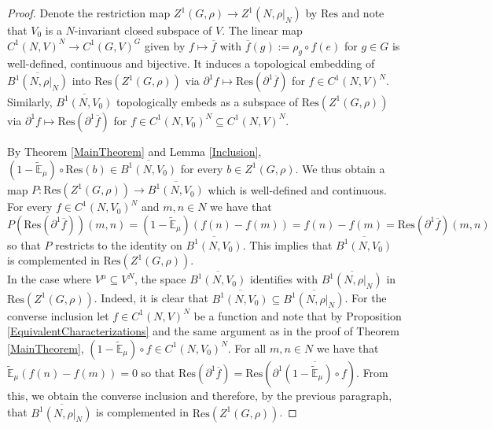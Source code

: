 \documentclass[a4paper,11pt,reqno]{amsart}
\numberwithin{equation}{section}
\theoremstyle{definition}
\theoremstyle{remark}
\theoremstyle{remark}
\begin{document}
\begin{proof} Denote the restriction map $Z^{1}(G,\rho)\rightarrow Z^{1}(N,\rho|_{N})$ by $\text{Res}$ and note that $V_{0}$ is a $N$-invariant closed subspace of $V$. The linear map $C^{1}(N,V)^{N}\rightarrow C^{1}(G,V)^{G}$ given by $f\mapsto\overline{f}$ with $\overline{f}(g):=\rho_{g}\circ f(e)$ for $g\in G$ is well-defined, continuous and bijective. It induces a topological embedding of $\overline{B^{1}(N,\rho|_{N})}$ into $\text{Res}(Z^{1}(G,\rho))$ via $\partial^{1}f\mapsto\text{Res}(\partial^{1}\overline{f})$ for $f\in C^{1}(N,V)^{N}$. Similarly, $\overline{B^{1}(N,V_{0})}$ topologically embeds as a subspace of $\text{Res}(Z^{1}(G,\rho))$ via $\partial^{1}f\mapsto\text{Res}(\partial^{1}\overline{f})$ for $f\in C^{1}(N,V_{0})^{N}\subseteq C^{1}(N,V)^{N}$.

By Theorem \ref{MainTheorem} and Lemma \ref{Inclusion}, $(1-\widetilde{\mathbb{E}}_{\mu})\circ\text{Res}(b)\in\overline{B^{1}(N,V_{0})}$ for every $b\in Z^{1}(G,\rho)$. We thus obtain a map $P:\text{Res}(Z^{1}(G,\rho))\rightarrow\overline{B^{1}(N,V_{0})}$ which is well-defined and continuous. For every $f\in C^{1}(N,V_{0})^{N}$ and $m,n\in N$ we have that 
\[
P(\text{Res}(\partial^{1}\overline{f}))(m,n)=(1-\widetilde{\mathbb{E}}_{\mu})\left(f(n)-f(m)\right)=f(n)-f(m)=\text{Res}(\partial^{1}\overline{f})(m,n)
\]
so that $P$ restricts to the identity on $\overline{B^{1}(N,V_{0})}$. This implies that $\overline{B^{1}(N,V_{0})}$ is complemented in $\text{Res}(Z^{1}(G,\rho))$.\\

In the case where $V^{\mu}\subseteq V^{N}$, the space $\overline{B^{1}(N,V_{0})}$ identifies with $\overline{B^{1}(N,\rho|_{N})}$ in $\text{Res}(Z^{1}(G,\rho))$. Indeed, it is clear that $\overline{B^{1}(N,V_{0})}\subseteq\overline{B^{1}(N,\rho|_{N})}$. For the converse inclusion let $f\in C^{1}(N,V)^{N}$ be a function and note that by Proposition \ref{EquivalentCharacterizations} and the same argument as in the proof of Theorem \ref{MainTheorem}, $(1-\widetilde{\mathbb{E}}_{\mu})\circ f\in C^{1}(N,V_{0})^{N}$. For all $m,n\in N$ we have that $\widetilde{\mathbb{E}}_{\mu}\left(f(n)-f(m)\right)=0$ so that $\text{Res}(\partial^{1}\overline{f})=\text{Res}(\partial^{1}\overline{(1-\widetilde{\mathbb{E}}_{\mu})\circ f})$. From this, we obtain the converse inclusion and therefore, by the previous paragraph, that $\overline{B^{1}(N,\rho|_{N})}$ is complemented in $\text{Res}(Z^{1}(G,\rho))$. \end{proof}
\end{document}
